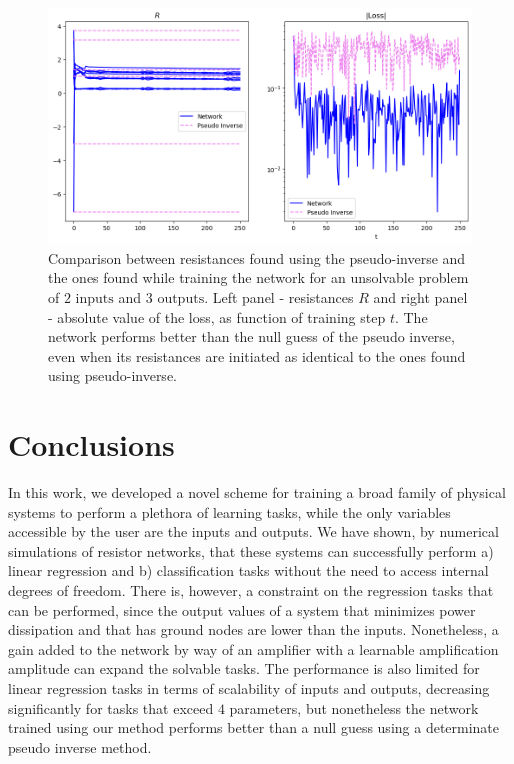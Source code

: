 \documentclass[%
 reprint,
 amsmath,amssymb,
 aps,
]{revtex4-2}
\begin{document}
    \begin{figure}[ht]
    \centerline{
    \includegraphics[width=\columnwidth]{Figures/pseudo_vs_network_comparison.png}
    }
    \caption{Comparison between resistances found using the pseudo-inverse and the ones found while training the network for an unsolvable problem of $2\text{ inputs}$ and $3\text{ outputs}$. Left panel - resistances $R$ and right panel - absolute value of the loss, as function of training step $t$. The network performs better than the null guess of the pseudo inverse, even when its resistances are initiated as identical to the ones found using pseudo-inverse.}
    \label{fig:pseudo_vs_network_comparison}
    \end{figure}

\section*{Conclusions}\label{sec:conclusions}

    In this work, we developed a novel scheme for training a broad family of physical systems to perform a plethora of learning tasks, while the only variables accessible by the user are the inputs and outputs. We have shown, by numerical simulations of resistor networks, that these systems can successfully perform a) linear regression and b) classification tasks without the need to access internal degrees of freedom. There is, however, a constraint on the regression tasks that can be performed, since the output values of a system that minimizes power dissipation and that has ground nodes are lower than the inputs. Nonetheless, a gain added to the network by way of an amplifier with a learnable amplification amplitude can expand the solvable tasks. The performance is also limited for linear regression tasks in terms of scalability of inputs and outputs, decreasing significantly for tasks that exceed $4$ parameters, but nonetheless the network trained using our method performs better than a null guess using a determinate pseudo inverse method. 
    
\end{document}

